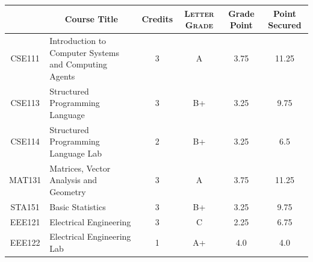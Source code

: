 \documentclass[11pt]{article}
\newcommand*{\numtwo}[1]{\pgfmathprintnumber[
                    fixed, precision=2, fixed zerofill=true]{#1}}
\begin{document}
                \begin{center}
                    \renewcommand{\arraystretch}{1.08}
                    
                \begin{tabular}{|c|l|c|>{\scshape}c|c|c|}
                \hline  \rule[-1ex]{0pt}{3.5ex} {\centering{\bf Course Code}} &  \multicolumn{1}{c|}{\textbf{Course Title}}  & {\bf Credits} & {\bf Letter Grade} & {\bf Grade Point} & {\bf Point Secured}  \\ 
                \hline   CSE111 &  Introduction to Computer Systems and Computing Agents		 & 3 & A & 3.75 & 11.25 \\ %
                \hline   CSE113 &  Structured Programming Language		 & 3 & B+ & 3.25 & 9.75 \\ %
                \hline   CSE114 &  Structured Programming Language Lab		 & 2 & B+ & 3.25 & 6.5 \\ %
                \hline   MAT131 &  Matrices, Vector Analysis and Geometry		 & 3 & A & 3.75 & 11.25 \\ %
                \hline   STA151 &  Basic Statistics		 & 3 & B+ & 3.25 & 9.75 \\ %
                \hline   EEE121 &  Electrical Engineering		 & 3 & C & 2.25 & 6.75 \\ %
                \hline   EEE122 &  Electrical Engineering Lab		 & 1 & A+ & 4.0 & 4.0 \\ %

\hline                %
                \end{tabular}
                \end{center}
                \renewcommand{\arraystretch}{1.03}
\end{document}

